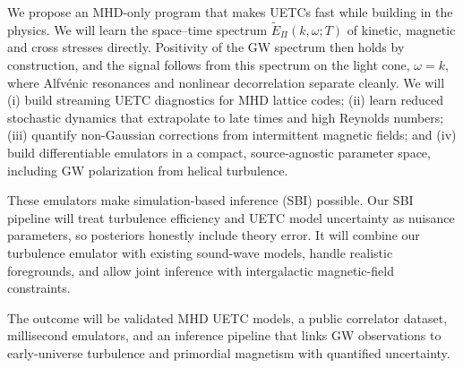 \documentclass{article}
\begin{document}
We propose an MHD-only program that makes UETCs fast while building in the physics.
We will learn the space--time spectrum $\tilde{E}_\Pi(k,\omega;T)$ of kinetic,
magnetic and cross stresses directly. Positivity of the GW spectrum then holds by
construction, and the signal follows from this spectrum on the light cone,
$\omega=k$, where Alfv\'enic resonances and nonlinear decorrelation separate
cleanly. We will
(i) build streaming UETC diagnostics for MHD lattice codes;
(ii) learn reduced stochastic dynamics that extrapolate to late times and high Reynolds numbers;
(iii) quantify non-Gaussian corrections from intermittent magnetic fields; and
(iv) build differentiable emulators in a compact, source-agnostic parameter space,
including GW polarization from helical turbulence.

These emulators make simulation-based inference (SBI) possible. Our SBI pipeline
will treat turbulence efficiency and UETC model uncertainty as nuisance
parameters, so posteriors honestly include theory error. It will combine our
turbulence emulator with existing sound-wave models, handle realistic foregrounds,
and allow joint inference with intergalactic magnetic-field constraints.

The outcome will be validated MHD UETC models, a public correlator dataset,
millisecond emulators, and an inference pipeline that links GW observations to
early-universe turbulence and primordial magnetism with quantified uncertainty.
\end{document}
